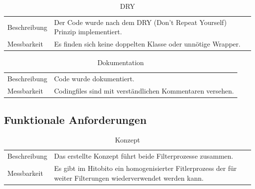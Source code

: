 \begin{table}[h!]
   \begin{tabular}{|L{0.3\textwidth}|L{0.6\textwidth}|}
       \hline
         \\[4pt]
       \hline
       Beschreibung & Der Code wurde nach dem DRY (Don't Repeat Yourself) Prinzip implementiert. \\
       \hline
       Messbarkeit & Es finden sich keine doppelten Klasse oder unnötige Wrapper.  \\
       \hline
     \end{tabular}
     \caption{DRY}
\end{table}

\newpage

\begin{table}[h!]
   \begin{tabular}{|L{0.3\textwidth}|L{0.6\textwidth}|}
       \hline
         \\[4pt]
       \hline
       Beschreibung & Code wurde dokumentiert. \\
       \hline
       Messbarkeit & Codingfiles sind mit verständlichen Kommentaren versehen.  \\
       \hline
     \end{tabular}
     \caption{Dokumentation}
\end{table}
 
\subsection{Funktionale Anforderungen}
\begin{table}[h!]
   \begin{tabular}{|L{0.3\textwidth}|L{0.6\textwidth}|}
       \hline
         \\[4pt]
       \hline
       Beschreibung & Das erstellte Konzept führt beide Filterprozesse zusammen. \\
       \hline
       Messbarkeit & Es gibt im Hitobito ein homogenisierter Fitlerprozess der für weiter Filterungen
       wiederverwendet werden kann.  \\
       \hline
     \end{tabular}
     \caption{Konzept}
\end{table}

